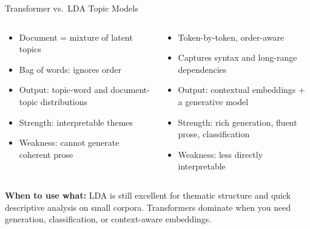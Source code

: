 \begin{frame}{Transformer vs.\ LDA Topic Models}
\begin{columns}[T]
\begin{tcolorbox}[colback=blue!5, colframe=blue!50!black, title=\textbf{LDA / topic models}]
\begin{itemize}
\item Document = mixture of latent topics
\item Bag of words: ignores order
\item Output: topic-word and document-topic distributions
\item Strength: interpretable themes
\item Weakness: cannot generate coherent prose
\end{itemize}
\end{tcolorbox}

\begin{tcolorbox}[colback=green!5, colframe=green!40!black, title=\textbf{Transformers}]
\begin{itemize}
\item Token-by-token, order-aware
\item Captures syntax and long-range dependencies
\item Output: contextual embeddings + a generative model
\item Strength: rich generation, fluent prose, classification
\item Weakness: less directly interpretable
\end{itemize}
\end{tcolorbox}
\end{columns}

\medskip
\textbf{When to use what:} LDA is still excellent for thematic structure and quick descriptive analysis on small corpora. Transformers dominate when you need generation, classification, or context-aware embeddings.
\end{frame}

